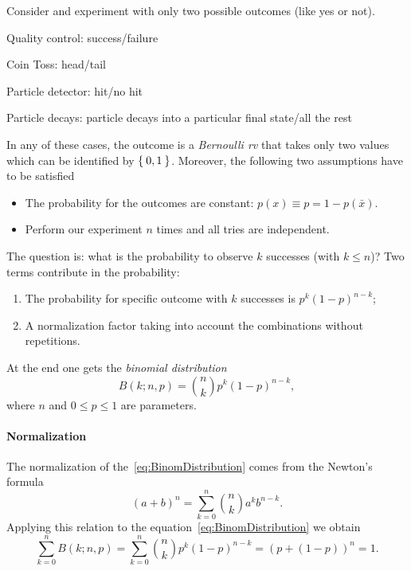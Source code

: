 \documentclass[
	10pt,
	draft
]{scrreprt}
\begin{document}
Consider and experiment with only two possible outcomes (like yes or not). 

Quality control: success/failure

Coin Toss: head/tail

Particle detector: hit/no hit

Particle decays: particle decays into a particular final state/all the rest


In any of these cases, the outcome is a \emph{Bernoulli \ac{rv}} that takes only two values which can be identified by $\Set{0,1}$.
Moreover, the following two assumptions have to be satisfied
\begin{itemize}
	\item
The probability for the outcomes are constant: $p(x) \equiv p = 1-p(\bar{x})$.
	\item
Perform our experiment $n$ times and all tries are independent.
\end{itemize}
The question is: what is the probability to observe $k$ successes (with $k\le n$)?
Two terms contribute in the probability:
\begin{enumerate}
	\item
The probability for specific outcome with $k$ successes is $p^k(1-p)^{n-k}$;
	\item
A normalization factor taking into account the combinations without repetitions. %
\end{enumerate}
At the end one gets the \emph{binomial distribution}
\begin{equation}\label{eq:BinomDistribution}
B(k;n,p) = {n\choose k}p^k(1-p)^{n-k},
\end{equation}
where $n$ and $0 \le p\le 1$ are parameters.

\paragraph{Normalization}
The normalization of the~\eqref{eq:BinomDistribution} comes from the Newton's formula
\begin{equation}
(a+b)^n = \sum_{k=0}^n {n\choose k} a^k b^{n-k}.
\end{equation}
Applying this relation to the equation~\eqref{eq:BinomDistribution} we obtain
\begin{equation}
\sum_{k=0}^n B(k;n,p) =
\sum_{k=0}^n {n\choose k}p^k(1-p)^{n-k}
= (p + (1-p))^n = 1.
\end{equation}
\end{document}
